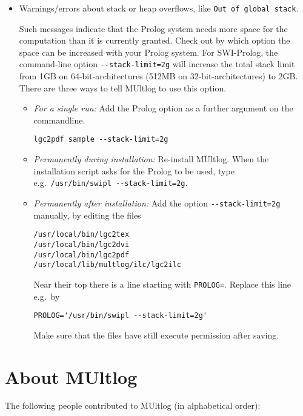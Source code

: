 \documentclass[]{article}
\begin{document}
\begin{itemize}
\item Warnings/errors about stack or heap overflows, like \verb"Out of global stack".

  Such messages indicate that the Prolog system needs more space for the computation than it is currently granted.
  Check out by which option the space can be increased with your Prolog system.
  For SWI-Prolog, the command-line option \verb"--stack-limit=2g" will increase the total stack limit from 1GB on 64-bit-architectures (512MB on 32-bit-architectures) to 2GB.
  There are three ways to tell MUltlog to use this option.

  \begin{itemize}
  \item \emph{For a single run:} Add the Prolog option as a further argument on the commandline.

   \verb"lgc2pdf sample --stack-limit=2g"

  \item \emph{Permanently during installation:}
    Re-install MUltlog.
    When the installation script asks for the
    Prolog to be used, type e.g.~\verb"/usr/bin/swipl --stack-limit=2g".
  \item \emph{Permanently after installation:}
    Add the option \verb"--stack-limit=2g" manually, by editing the
    files
\begin{verbatim}
/usr/local/bin/lgc2tex
/usr/local/bin/lgc2dvi
/usr/local/bin/lgc2pdf
/usr/local/lib/multlog/ilc/lgc2ilc
\end{verbatim}

    Near their top there is a line starting with \texttt{PROLOG=}.
    Replace this line e.g.~by

\begin{verbatim}
PROLOG='/usr/bin/swipl --stack-limit=2g'
\end{verbatim}

    Make sure that the files have still execute permission after saving.
  \end{itemize}
\end{itemize}

\hypertarget{about-multlog}{%
\section{About MUltlog}\label{about-multlog}}

The following people contributed to MUltlog (in alphabetical order):
\end{document}
